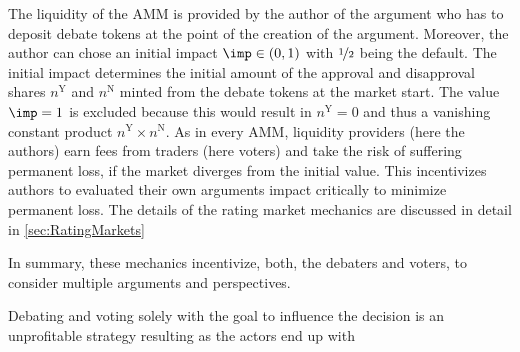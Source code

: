 \documentclass[%
aip,
amsmath,amssymb,
reprint,%
unsortedaddress,
nofootinbib
]{revtex4-2}
\newcommand{\Y}{\text{Y}}
\newcommand{\N}{\text{N}}
\begin{document}
The liquidity of the \ac{AMM} is provided by the author of the argument who has to deposit debate tokens at the point of the creation of the argument.
Moreover, the author can chose an initial impact $\imp\in (0,1)$ with $\nicefrac{1}{2}$ being the default.
The initial impact determines the initial amount of the approval and disapproval shares $n^\Y$ and $n^\N$ minted from the debate tokens at the market start.
The value $\imp=1$ is excluded because this would result in $n^\Y=0$ and thus a vanishing constant product $n^\Y\times n^\N$.
As in every \ac{AMM}, liquidity providers (here the authors)
earn fees from traders (here voters)
and 
take the risk of suffering permanent loss, if the market diverges from the initial value.
This incentivizes authors to evaluated their own arguments impact critically 
to minimize permanent loss. 
The details of the rating market mechanics are discussed in detail in \cref{sec:RatingMarkets}

In summary, these mechanics incentivize, both, the debaters and voters, to consider multiple arguments and perspectives.
 
Debating and voting solely with the goal to influence the decision is an unprofitable  strategy resulting
as the actors end up with 

\end{document}
